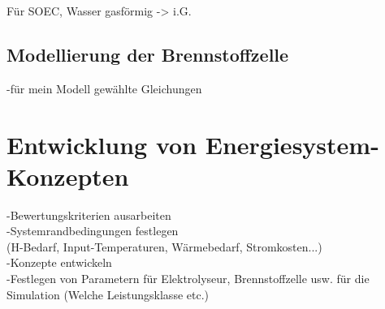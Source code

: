 Für SOEC, Wasser gasförmig -> i.G.\\


\subsection{Modellierung der Brennstoffzelle}
-für mein Modell gewählte Gleichungen\\

\section{Entwicklung von Energiesystem-Konzepten}
-Bewertungskriterien ausarbeiten\\
-Systemrandbedingungen festlegen\\
(H-Bedarf, Input-Temperaturen, Wärmebedarf, Stromkosten...)\\
-Konzepte entwickeln\\
-Festlegen von Parametern für Elektrolyseur, Brennstoffzelle usw. für die Simulation (Welche Leistungsklasse etc.)\\

